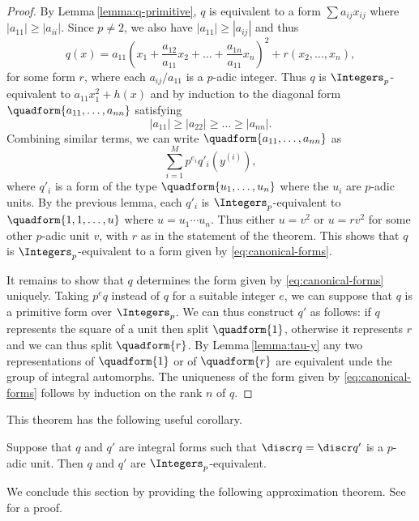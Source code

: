 \begin{proof}
    By Lemma\,\ref{lemma:q-primitive}, \(q\) is equivalent to a form \(\sum a_{ij}x_{ij}\) where \(|a_{11}| \geq |a_{ii}|\). Since \(p \neq 2\), we also have \(|a_{11}| \geq |a_{ij}|\) and thus
    \[
        q(x) = a_{11}\left(x_1 + \frac{a_{12}}{a_{11}}x_2 + \dots + \frac{a_{1n}}{a_{11}}x_n\right)^2 + r(x_2, \dots, x_n),
    \]
    for some form \(r\), where each \(a_{ij}/a_{11}\) is a \(p\)-adic integer. Thus \(q\) is \(\Integers_p\)-equivalent to \(a_{11}x_1^2 + h(x)\) and by induction to the diagonal form \(\quadform{a_{11}, \dots, a_{nn}}\) satisfying
    \[
        |a_{11}| \geq |a_{22}| \geq \dots \geq |a_{nn}|.    
    \]
    Combining similar terms, we can write \(\quadform{a_{11}, \dots, a_{nn}}\) as
    \[
        \sum_{i=1}^M p^{e_i} q'_i(y^{(i)}),
    \]
    where \(q'_i\) is a form of the type \(\quadform{u_1, \dots, u_n}\) where the \(u_i\) are \(p\)-adic units. By the previous lemma, each \(q'_i\) is \(\Integers_p\)-equivalent to \(\quadform{1, 1, \dots, u}\) where \(u = u_1 \cdots u_n\). Thus either \(u = v^2\) or \(u = rv^2\) for some other \(p\)-adic unit \(v\), with \(r\) as in the statement of the theorem. This shows that \(q\) is \(\Integers_p\)-equivalent to a form given by \eqref{eq:canonical-forms}.

    It remains to show that \(q\) determines the form given by \eqref{eq:canonical-forms} uniquely. Taking \(p^eq\) instead of \(q\) for a suitable integer \(e\), we can suppose that \(q\) is a primitive form over \(\Integers_p\). We can thus construct \(q'\) as follows: if \(q\) represents the square of a unit then split \(\quadform{1}\), otherwise it represents \(r\) and we can thus split \(\quadform{r}\). By Lemma\,\ref{lemma:tau-y} any two representations of \(\quadform{1}\) or of \(\quadform{r}\) are equivalent unde the group of integral automorphs. The uniqueness of the form given by \eqref{eq:canonical-forms} follows by induction on the rank \(n\) of \(q\).
\end{proof}

\medskip

This theorem has the following useful corollary.

\begin{corollary}
    Suppose that \(q\) and \(q'\) are integral forms such that \(\discr q = \discr q'\) is a \(p\)-adic unit. Then \(q\) and \(q'\) are \(\Integers_p\)-equivalent.
\end{corollary}

We conclude this section by providing the following approximation theorem. See \cite[p.\,126--127]{cassels2008rational} for a proof.


